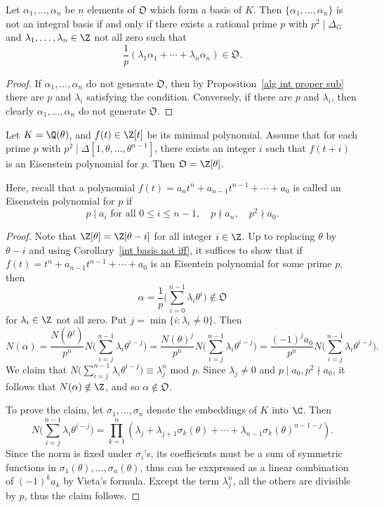 \begin{corollary}\label{int basis not iff}
Let $\alpha_1,\dots,\alpha_n$ be $n$ elements of $\mathfrak{O}$ which form a basis of $K$. Then $\{\alpha_1,\dots,\alpha_n\}$ is not an integral basis if and only if there exists a rational prime $p$ with $p^2\mid\Delta_G$ and $\lambda_1,\dots,\lambda_n\in\Z$ not all zero such that
\[\frac{1}{p}(\lambda_1\alpha_1+\cdots+\lambda_n\alpha_n)\in\mathfrak{O}.\]
\end{corollary}
\begin{proof}
If $\alpha_1,\dots,\alpha_n$ do not generate $\mathfrak{O}$, then by Proposition~\ref{alg int proper sub} there are $p$ and $\lambda_i$ satisfying the condition. Conversely, if there are $p$ and $\lambda_i$, then clearly $\alpha_1,\dots,\alpha_n$ do not generate $\mathfrak{O}$.
\end{proof}
\begin{proposition}\label{int basis if Eisenstein}
Let $K=\Q(\theta)$, and $f(t)\in\Z[t]$ be its minimal polynomial. Assume that for each prime $p$ with $p^2\mid\Delta[1,\theta,\dots,\theta^{n-1}]$, there exists an integer $i$ such that $f(t+i)$ is an Eisenstein polynomial for $p$. Then $\mathfrak{O}=\Z[\theta]$.
\end{proposition}
Here, recall that a polynomial $f(t)=a_nt^n+a_{n-1}t^{n-1}+\cdots+a_0$ is called an Eisenstein polynomial for $p$ if
\[p\mid a_i\text{ for all }0\leq i\leq n-1,\quad p\nmid a_n,\quad p^2\nmid a_0.\]
\begin{proof}
Note that $\Z[\theta]=\Z[\theta-i]$ for all integer $i\in\Z$. Up to replacing $\theta$ by $\theta-i$ and using Corollary~\ref{int basis not iff}, it suffices to show that if $f(t)=t^n+a_{n-1}t^{n-1}+\cdots+a_0$ is an Eisentein polynomial for some prime $p$, then \[\alpha=\frac{1}{p}\Big(\sum_{i=0}^{n-1}\lambda_i\theta^i\Big)\notin\mathfrak{O}\]for $\lambda_i\in\Z$ not all zero. Put $j=\min\{i:\lambda_i\neq 0\}$. Then
\[N(\alpha)=\frac{N(\theta^j)}{p^n}N\Big(\sum_{i=j}^{n-1}\lambda_i\theta^{i-j}\Big)=\frac{N(\theta)^j}{p^n}N\Big(\sum_{i=j}^{n-1}\lambda_i\theta^{i-j}\Big)=\frac{(-1)^ja_0}{p^n}N\Big(\sum_{i=j}^{n-1}\lambda_i\theta^{i-j}\Big).\]
We claim that $N\Big(\sum_{i=j}^{n-1}\lambda_i\theta^{i-j}\Big)\equiv \lambda_j^n$ mod $p$. Since $\lambda_j\neq 0$ and $p\mid a_0,p^2\nmid a_0$, it follows that $N(\alpha)\notin\Z$, and so $\alpha\notin\mathfrak{O}$.\par
To prove the claim, let $\sigma_1,\dots,\sigma_n$ denote the embeddings of $K$ into $\C$. Then
\[N\Big(\sum_{i=j}^{n-1}\lambda_i\theta^{i-j}\Big)=\prod_{k=1}^{n}(\lambda_j+\lambda_{j+1}\sigma_k(\theta)+\cdots+\lambda_{n-1}\sigma_k(\theta)^{n-1-j}).\]
Since the norm is fixed under $\sigma_i$'s, its coefficients must be a sum of symmetric functions in $\sigma_1(\theta),\dots,\sigma_n(\theta)$, thus can be exxpressed as a linear combination of $(-1)^ka_k$ by Vieta's formula. Except the term $\lambda_j^n$, all the others are divisible by $p$, thus the claim follows.
\end{proof}
